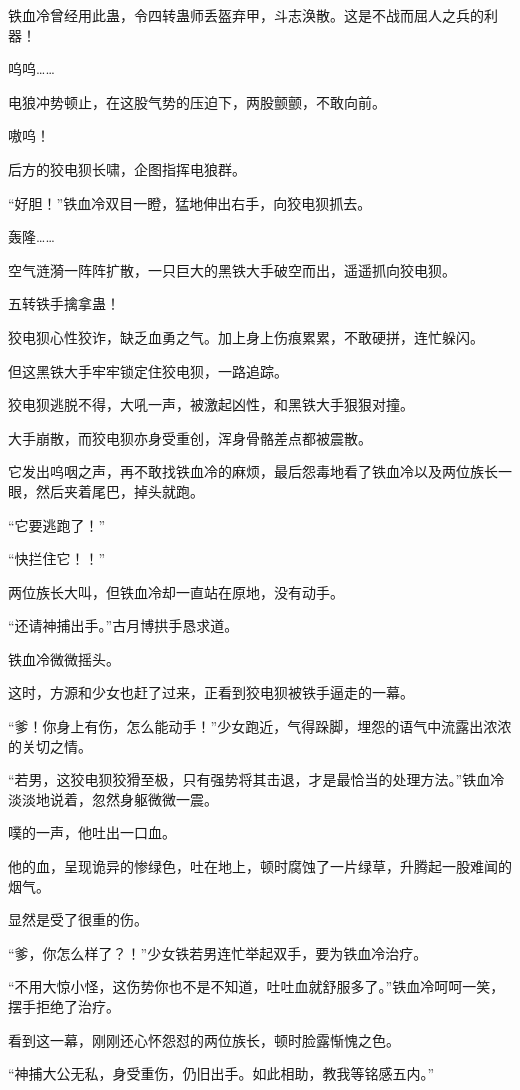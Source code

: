 \begin{this_body}
铁血冷曾经用此蛊，令四转蛊师丢盔弃甲，斗志涣散。这是不战而屈人之兵的利器！

呜呜……

电狼冲势顿止，在这股气势的压迫下，两股颤颤，不敢向前。

嗷呜！

后方的狡电狈长啸，企图指挥电狼群。

“好胆！”铁血冷双目一瞪，猛地伸出右手，向狡电狈抓去。

轰隆……

空气涟漪一阵阵扩散，一只巨大的黑铁大手破空而出，遥遥抓向狡电狈。

五转铁手擒拿蛊！

狡电狈心性狡诈，缺乏血勇之气。加上身上伤痕累累，不敢硬拼，连忙躲闪。

但这黑铁大手牢牢锁定住狡电狈，一路追踪。

狡电狈逃脱不得，大吼一声，被激起凶性，和黑铁大手狠狠对撞。

大手崩散，而狡电狈亦身受重创，浑身骨骼差点都被震散。

它发出呜咽之声，再不敢找铁血冷的麻烦，最后怨毒地看了铁血冷以及两位族长一眼，然后夹着尾巴，掉头就跑。

“它要逃跑了！”

“快拦住它！！”

两位族长大叫，但铁血冷却一直站在原地，没有动手。

“还请神捕出手。”古月博拱手恳求道。

铁血冷微微摇头。

这时，方源和少女也赶了过来，正看到狡电狈被铁手逼走的一幕。

“爹！你身上有伤，怎么能动手！”少女跑近，气得跺脚，埋怨的语气中流露出浓浓的关切之情。

“若男，这狡电狈狡猾至极，只有强势将其击退，才是最恰当的处理方法。”铁血冷淡淡地说着，忽然身躯微微一震。

噗的一声，他吐出一口血。

他的血，呈现诡异的惨绿色，吐在地上，顿时腐蚀了一片绿草，升腾起一股难闻的烟气。

显然是受了很重的伤。

“爹，你怎么样了？！”少女铁若男连忙举起双手，要为铁血冷治疗。

“不用大惊小怪，这伤势你也不是不知道，吐吐血就舒服多了。”铁血冷呵呵一笑，摆手拒绝了治疗。

看到这一幕，刚刚还心怀怨怼的两位族长，顿时脸露惭愧之色。

“神捕大公无私，身受重伤，仍旧出手。如此相助，教我等铭感五内。”


\end{this_body}
